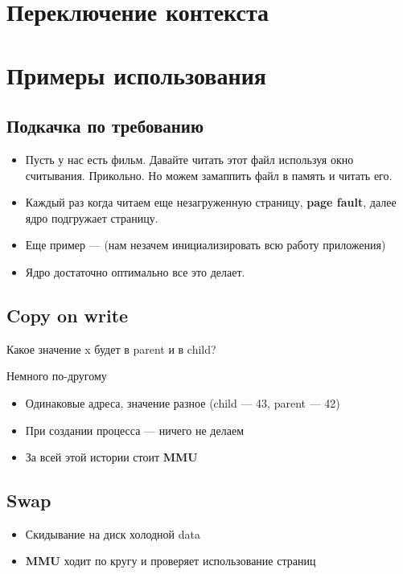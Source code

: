 \documentclass[../../lectures.tex]{subfiles}
\begin{document}
\section{Переключение контекста}
\todo{}

\section{Примеры использования}
\subsection{Подкачка по требованию}
\begin{itemize}
    \item Пусть у нас есть фильм. Давайте читать этот файл используя
          окно считывания. Прикольно. Но можем замаппить файл в память 
          и читать его.
    \item Каждый раз когда читаем еще незагруженную страницу, \textbf{page fault},
          далее ядро подгружает страницу.
    \item Еще пример ---  (нам незачем инициализировать всю работу приложения)
    \item Ядро достаточно оптимально все это делает.
\end{itemize}
\subsection{Copy on write}
Какое значение x будет в parent и в child?

Немного по-другому
\begin{itemize}
    \item Одинаковые адреса, значение разное (child --- 43, parent --- 42)
    \item При создании процесса --- ничего не делаем
    \item За всей этой истории стоит \textbf{MMU}
\end{itemize}

\subsection{Swap}
\begin{itemize}
    \item Скидывание на диск холодной data
    \item \textbf{MMU} ходит по кругу и проверяет использование страниц
\end{itemize}
\end{document}
